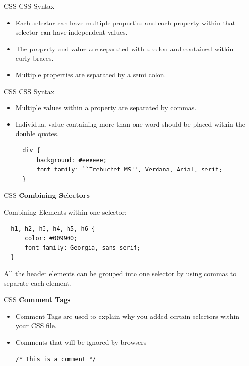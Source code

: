 \documentclass[14pt]{beamer}
\begin{document}
\begin{frame}{CSS}
CSS Syntax
\begin{itemize}
 \item Each selector can have multiple properties and each property within that selector can have independent values.
 \item The property and value are separated with a colon and contained within curly braces.
 \item Multiple properties are separated by a semi colon.
\end{itemize}
\end{frame}

\begin{frame}[fragile]{CSS}
CSS Syntax
\begin{itemize}
 \item Multiple values within a property are separated by commas.
 \item Individual value containing more than one word should be placed within the double quotes.
 \begin{lstlisting}
  div {
      background: #eeeeee;
      font-family: ``Trebuchet MS'', Verdana, Arial, serif;
  }
 \end{lstlisting}
\end{itemize}
\end{frame}

\begin{frame}[fragile]{CSS}
\textbf{Combining Selectors}

\vspace{1pc}
Combining Elements within one selector:
\begin{lstlisting}
  h1, h2, h3, h4, h5, h6 {
      color: #009900;
      font-family: Georgia, sans-serif;
  }
\end{lstlisting}
All the header elements can be grouped into one selector by using commas to separate each element.
\end{frame}

\begin{frame}{CSS}
\textbf{Comment Tags}
\begin{itemize}
 \item Comment Tags are used to explain why you added certain selectors within your CSS file.

 \item Comments that will be ignored by browsers

 \lstinline!/* This is a comment */!
\end{itemize}
\end{frame}
\end{document}
